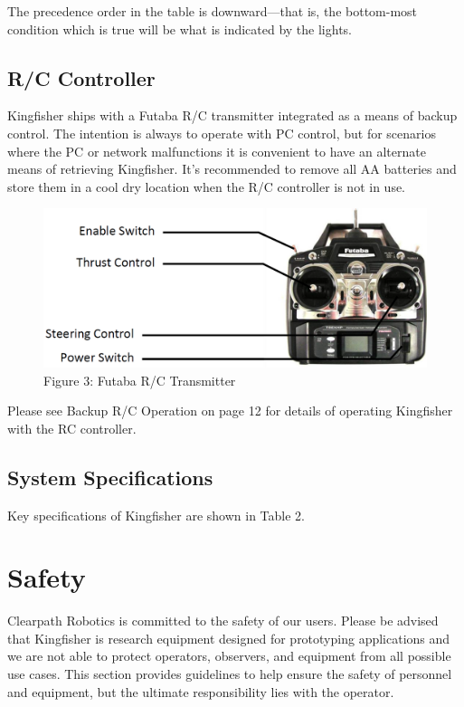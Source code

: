\documentclass[]{clearpath-latex/clearpath-manual}
\begin{document}
The precedence order in the table is downward—that is, the bottom-most condition which is true will be what is indicated by the lights.

\subsection{R/C Controller}
Kingfisher ships with a Futaba R/C transmitter integrated as a means of backup control. The intention is always to operate with PC control, but for scenarios where the PC or network malfunctions it is convenient to have an alternate means of retrieving Kingfisher. It’s recommended to remove all AA batteries and store them in a cool dry location when the R/C controller is not in use.

\begin{figure}[h]
  \centering
  \includegraphics[width=0.75\linewidth]{kf_futaba.PNG}
  \caption{Figure 3: Futaba R/C Transmitter}
  \label{kf_futaba}
\end{figure}
Please see Backup R/C Operation on page 12 for details of operating Kingfisher with the RC controller.
\newpage

\subsection{System Specifications}
Key specifications of Kingfisher are shown in Table 2.


\newpage

\section{Safety}
Clearpath Robotics is committed to the safety of our users. Please be advised that Kingfisher is research equipment designed for prototyping applications and we are not able to protect operators, observers, and equipment from all possible use cases. This section provides guidelines to help ensure the safety of personnel and equipment, but the ultimate responsibility lies with the operator.
\end{document}
